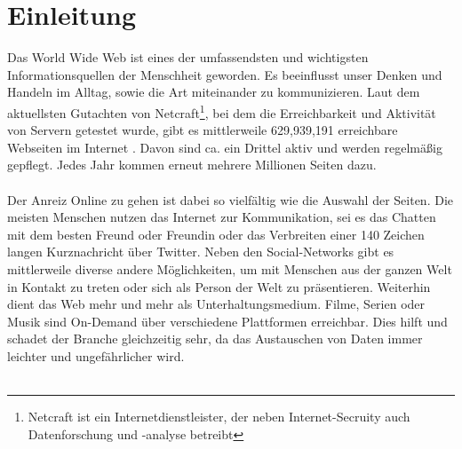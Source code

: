 %
%
%
%


\chapter{Einleitung}

Das World Wide Web ist eines der umfassendsten und wichtigsten Informationsquellen der Menschheit geworden. Es beeinflusst unser Denken und Handeln im Alltag, sowie die Art miteinander zu kommunizieren. Laut dem aktuellsten Gutachten von Netcraft\footnote{Netcraft ist ein Internetdienstleister, der neben Internet-Secruity auch Datenforschung und -analyse betreibt}, bei dem die Erreichbarkeit und Aktivität von Servern getestet wurde, gibt es mittlerweile 629,939,191 erreichbare Webseiten im Internet \cite{websurvey}. Davon sind ca. ein Drittel aktiv und werden regelmäßig gepflegt. Jedes Jahr kommen erneut mehrere Millionen Seiten dazu.\\
\\
Der Anreiz \glqq Online zu gehen\grqq{} ist dabei so vielfältig wie die Auswahl der Seiten. Die meisten Menschen nutzen das Internet zur Kommunikation, sei es das Chatten mit dem besten Freund oder Freundin oder das Verbreiten einer 140 Zeichen langen Kurznachricht über Twitter. Neben den Social-Networks gibt es mittlerweile diverse andere Möglichkeiten, um mit Menschen aus der ganzen Welt in Kontakt zu treten oder sich als Person der Welt zu präsentieren. Weiterhin dient das Web mehr und mehr als Unterhaltungsmedium. Filme, Serien oder Musik sind \Gls{On-Demand} über verschiedene Plattformen erreichbar. Dies hilft und schadet der Branche gleichzeitig sehr, da das Austauschen von Daten immer leichter und ungefährlicher wird.\\
\\
